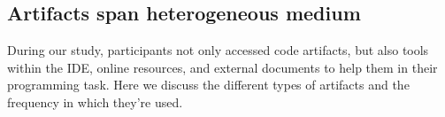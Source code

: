 





\subsection{Artifacts span heterogeneous medium}
During our study, participants not only accessed code artifacts, but also tools within the IDE, online resources, and external documents to help them in their programming task. Here we discuss the different types of artifacts and the frequency in which they're used.

